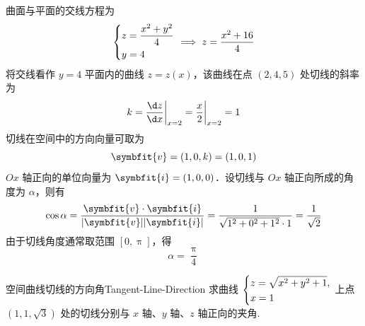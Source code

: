 \begin{solution}
    曲面与平面的交线方程为
    \begin{equation}
        \begin{dcases}
            z = \frac{x^2+y^2}{4} \\
            y = 4
        \end{dcases} \implies z = \frac{x^2+16}{4}
    \end{equation}
    将交线看作 $y=4$ 平面内的曲线 $z = z(x)$，该曲线在点 $(2, 4, 5)$ 处切线的斜率为
    \begin{equation}
        k = \frac{\d z}{\d x} \bigg|_{x=2} = \frac{x}{2} \bigg|_{x=2} = 1
    \end{equation}
    切线在空间中的方向向量可取为
    \begin{equation}
        \symbfit{v} = (1, 0, k) = (1, 0, 1)
    \end{equation}
    $Ox$ 轴正向的单位向量为 $\symbfit{i} = (1, 0, 0)$．设切线与 $Ox$ 轴正向所成的角度为 $\alpha$，则有
    \begin{equation}
        \cos \alpha = \frac{\symbfit{v} \cdot \symbfit{i}}{|\symbfit{v}| |\symbfit{i}|} = \frac{1}{\sqrt{1^2 + 0^2 + 1^2} \cdot 1} = \frac{1}{\sqrt{2}}
    \end{equation}
    由于切线角度通常取范围 $[0, \uppi]$，得
    \begin{equation}
        \boxed{\alpha = \frac{\uppi}{4}}
    \end{equation}
\end{solution}


\begin{problem}{空间曲线切线的方向角}{Tangent-Line-Direction}
    求曲线 $\begin{dcases} z = \sqrt{x^2 + y^2 + 1}, \\ x = 1 \end{dcases}$ 上点 $(1, 1, \sqrt{3})$ 处的切线分别与 $x$ 轴、$y$ 轴、$z$ 轴正向的夹角.
\end{problem}

